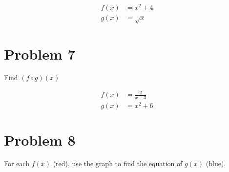 \documentclass[tikz,border=10pt]{article}
\begin{document}
\begin{align*}
    f(x) &= x^2 + 4 \\
    g(x) &= \sqrt{x}
\end{align*}

\section*{Problem 7}

Find $(f \circ g)(x)$

\begin{align*}
    f(x) &= \frac{2}{x - 3} \\
    g(x) &= x^{2} + 6
\end{align*}

\section*{Problem 8}

For each $f(x)$ (red), use the graph to find the equation of $g(x)$ (blue).
\end{document}
